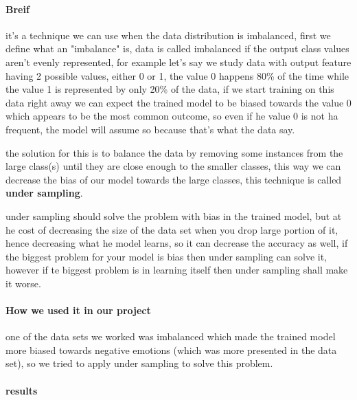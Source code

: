 \paragraph{Breif}
it's a technique we can use when the data distribution is imbalanced, first we define what an "imbalance" is, data is called imbalanced if the output class values aren't evenly represented, for example let's say we study data with output feature having 2 possible values, either 0 or 1, the value 0 happens 80\% of the time while the value 1 is represented by only 20\% of the data, if we start training on this data right away we can expect the trained model to be biased towards the value 0 which appears to be the most common outcome, so even if he value 0 is not ha frequent, the model will assume so because that's what the data say. \newline

the solution for this is to balance the data by removing some instances from the large class(s) until they are close enough to the smaller classes, this way we can decrease the bias of our model towards the large classes, this technique is called \textbf{under sampling}. \newline 

under sampling should solve the problem with bias in the trained model, but at he cost of decreasing the size of the data set when you drop large portion of it, hence decreasing what he model learns, so it can decrease the accuracy as well, if the biggest problem for your model is bias then under sampling can solve it, however if te biggest problem is in learning itself then under sampling shall make it worse.

\paragraph{How we used it in our project}
one of the data sets we worked was imbalanced which made the trained model more biased towards negative emotions (which was more presented in the data set), so we tried to apply under sampling to solve this problem. \newline

\paragraph{results}

